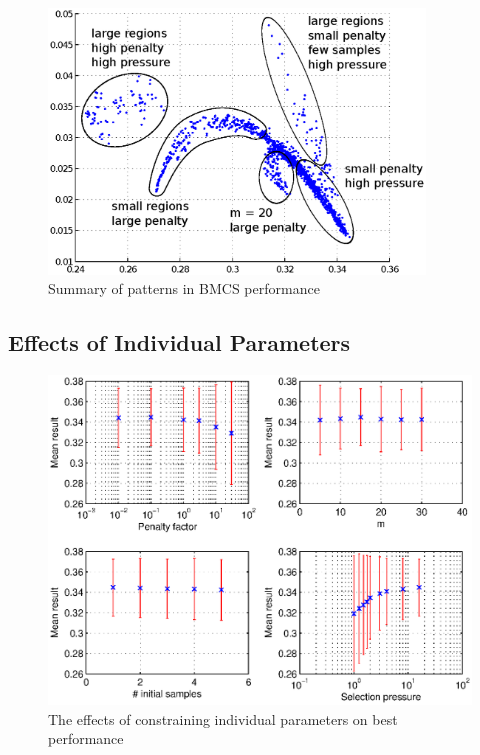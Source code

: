 \documentclass[10pt]{article}
\begin{document}
\begin{itemize}
\begin{figure}
  \begin{center}
    \includegraphics[width=10cm]{bmcs_perf_summary.eps}
    \end{center}
    \caption{Summary of patterns in BMCS performance}
    \label{fig:bmcs_perf_summary}
    \end{figure}

\end{itemize}

\subsection{Effects of Individual Parameters}

\begin{figure}
  \begin{center}
    \includegraphics{bmcs_plots.eps}
    \end{center}
    \caption{The effects of constraining individual parameters on best
    performance}
    \label{fig:bmcs_plots}
    \end{figure}
\end{document}
